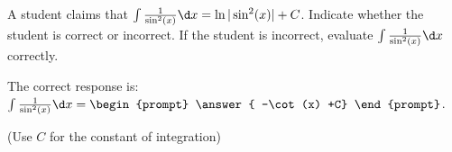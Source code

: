 \documentclass{ximera}
\author{Jim Talamo}
\begin{document}
\begin{exercise}
A student claims that $\int \frac{1}{\sin^2(x)} \d x = \ln|\sin^2(x)|+C$.  Indicate whether the student is correct or incorrect.  If the student is incorrect, evaluate $\int \frac{1}{\sin^2(x)} \d x $ correctly.

\begin{multipleChoice}  

The correct response is: $\int \frac{1}{\sin^2(x)} \d x = \begin{prompt} \answer{ -\cot(x) +C} \end{prompt} $.
\end{multipleChoice}

\begin{prompt} (Use $C$ for the constant of integration) \end{prompt}

\end{exercise}
\end{document}
